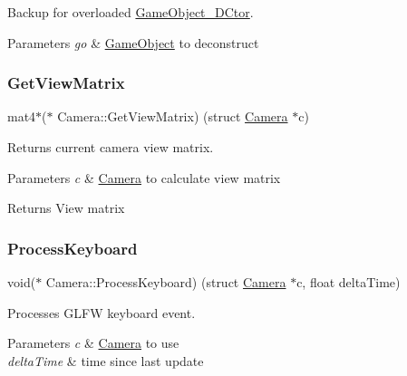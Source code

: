 Backup for overloaded \mbox{\hyperlink{struct_camera_acdec9e05794ea2771f97316373556a46}{Game\+Object\+\_\+\+D\+Ctor}}. 


\begin{DoxyParams}{Parameters}
{\em go} & \mbox{\hyperlink{struct_game_object}{Game\+Object}} to deconstruct \\
\hline
\end{DoxyParams}
\mbox{\label{struct_camera_a9bafa1f3bcffbe76cc3a602f0279cc51}} 
\subsubsection{\texorpdfstring{GetViewMatrix}{GetViewMatrix}}
{\footnotesize\ttfamily mat4$\ast$($\ast$ Camera\+::\+Get\+View\+Matrix) (struct \mbox{\hyperlink{struct_camera}{Camera}} $\ast$c)}



Returns current camera view matrix. 


\begin{DoxyParams}{Parameters}
{\em c} & \mbox{\hyperlink{struct_camera}{Camera}} to calculate view matrix \\
\hline
\end{DoxyParams}
\begin{DoxyReturn}{Returns}
View matrix 
\end{DoxyReturn}
\mbox{\label{struct_camera_a13434f409d30054379ec14e2ad129eb7}} 
\subsubsection{\texorpdfstring{ProcessKeyboard}{ProcessKeyboard}}
{\footnotesize\ttfamily void($\ast$ Camera\+::\+Process\+Keyboard) (struct \mbox{\hyperlink{struct_camera}{Camera}} $\ast$c, float delta\+Time)}



Processes G\+L\+FW keyboard event. 


\begin{DoxyParams}{Parameters}
{\em c} & \mbox{\hyperlink{struct_camera}{Camera}} to use \\
\hline
{\em delta\+Time} & time since last update \\
\hline
\end{DoxyParams}
\mbox{\label{struct_camera_a29dd103bc4169133d8ee899ac875e798}} 
